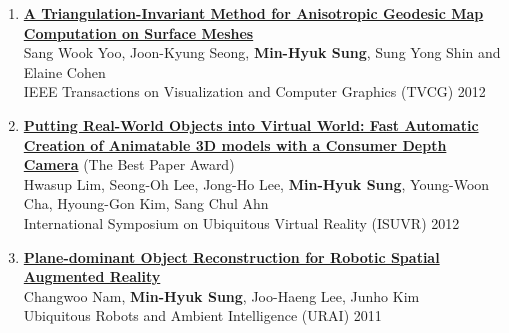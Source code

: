 \documentclass[letterpaper,10pt]{article} %
\newcommand{\blankline}{\quad\pagebreak[2]}
\begin{document}
{\begin{enumerate}
\item \label{tvcg12}
\href{http://dx.doi.org/10.1109/TVCG.2012.29}{\textbf{A Triangulation-Invariant Method for Anisotropic Geodesic Map Computation on Surface Meshes}} \\
Sang Wook Yoo, Joon-Kyung Seong, \textbf{Min-Hyuk Sung}, Sung Yong Shin and Elaine Cohen\\
IEEE Transactions on Visualization and Computer Graphics (TVCG) 2012\\
\blankline

\item \label{isuvr12}
\href{http://dx.doi.org/10.1109/ISUVR.2012.12}{\textbf{Putting Real-World Objects into Virtual World: Fast Automatic Creation of Animatable 3D models with a Consumer Depth Camera}} (The Best Paper Award)\\
Hwasup Lim, Seong-Oh Lee, Jong-Ho Lee, \textbf{Min-Hyuk Sung}, Young-Woon Cha, Hyoung-Gon Kim, Sang Chul Ahn \\
International Symposium on Ubiquitous Virtual Reality (ISUVR) 2012\\
\blankline

\item \label{urai11}
\href{http://dx.doi.org/10.1109/URAI.2011.6145896}{\textbf{Plane-dominant Object Reconstruction for Robotic Spatial Augmented Reality}} \\
Changwoo Nam, \textbf{Min-Hyuk Sung}, Joo-Haeng Lee, Junho Kim \\
Ubiquitous Robots and Ambient Intelligence (URAI) 2011 \\
\blankline

%


\end{enumerate}}
\end{document}
